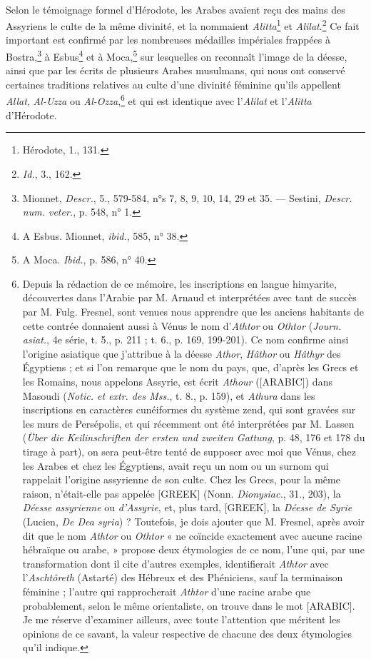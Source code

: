 \documentclass[a4paper, 11pt, oneside, polutonikogreek, french]{article}
\begin{document}
\paragraph{}
Selon le témoignage formel d'Hérodote, les Arabes avaient reçu des mains des Assyriens le culte de la même divinité, et la nommaient \emph{Alitta}\footnote{Hérodote, 1., 131.} et \emph{Alilat}.\footnote{\emph{Id.}, 3., 162.} Ce fait important est confirmé par les nombreuses médailles impériales frappées à Bostra,\footnote{Mionnet, \emph{Descr.}, 5., 579-584, n°s 7, 8, 9, 10, 14, 29 et 35. --- Sestini, \emph{Descr. num. veter.}, p. 548, n° 1.} à Esbus\footnote{A Esbus. Mionnet, \emph{ibid.}, 585, n° 38.} et à Moca,\footnote{A Moca. \emph{Ibid.}, p. 586, n° 40.} sur lesquelles on reconnaît l'image de la déesse, ainsi que par les écrits de plusieurs Arabes musulmans, qui nous ont conservé certaines traditions relatives au culte d'une divinité féminine qu'ils appellent \emph{Allat}, \emph{Al-Uzza} ou \emph{Al-Ozza},\footnote{Depuis la rédaction de ce mémoire, les inscriptions en langue himyarite, découvertes dans l'Arabie par M. Arnaud et interprétées avec tant de succès par M. Fulg. Fresnel, sont venues nous apprendre que les anciens habitants de cette contrée donnaient aussi à Vénus le nom d'\emph{Athtor} ou \emph{Othtor} (\emph{Journ. asiat.}, 4e série, t. 5., p. 211 ; t. 6., p. 169, 199-201). Ce nom confirme ainsi l'origine asiatique que j'attribue à la déesse \emph{Athor}, \emph{Hâthor} ou \emph{Hâthyr} des Égyptiens ; et si l'on remarque que le nom du pays, que, d'après les Grecs et les Romains, nous appelons Assyrie, est écrit \emph{Athour} ([ARABIC]) dans Masoudi (\emph{Notic. et extr. des Mss.}, t. 8., p. 159), et \emph{Athura} dans les inscriptions en caractères cunéiformes du système zend, qui sont gravées sur les murs de Persépolis, et qui récemment ont été interprétées par M. Lassen (\emph{Über die Keilinschriften der ersten und zweiten Gattung}, p. 48, 176 et 178 du tirage à part), on sera peut-être tenté de supposer avec moi que Vénus, chez les Arabes et chez les Égyptiens, avait reçu un nom ou un surnom qui rappelait l'origine assyrienne de son culte. Chez les Grecs, pour la même raison, n'était-elle pas appelée [GREEK] (Nonn. \emph{Dionysiac.}, 31., 203), la \emph{Déesse assyrienne} ou \emph{d'Assyrie}, et, plus tard, [GREEK], la \emph{Déesse de Syrie} (Lucien, \emph{De Dea syria}) ? Toutefois, je dois ajouter que M. Fresnel, après avoir dit que le nom \emph{Athtor} ou \emph{Othtor} « ne coïncide exactement avec aucune racine hébraïque ou arabe, » propose deux étymologies de ce nom, l'une qui, par une transformation dont il cite d'autres exemples, identifierait \emph{Athtor} avec l'\emph{Aschtôreth} (Astarté) des Hébreux et des Phéniciens, sauf la terminaison féminine ; l'autre qui rapprocherait \emph{Athtor} d'une racine arabe que probablement, selon le même orientaliste, on trouve dans le mot [ARABIC]. Je me réserve d'examiner ailleurs, avec toute l'attention que méritent les opinions de ce savant, la valeur respective de chacune des deux étymologies qu'il indique.} et qui est identique avec l'\emph{Alilat} et l'\emph{Alitta} d'Hérodote.
\end{document}
